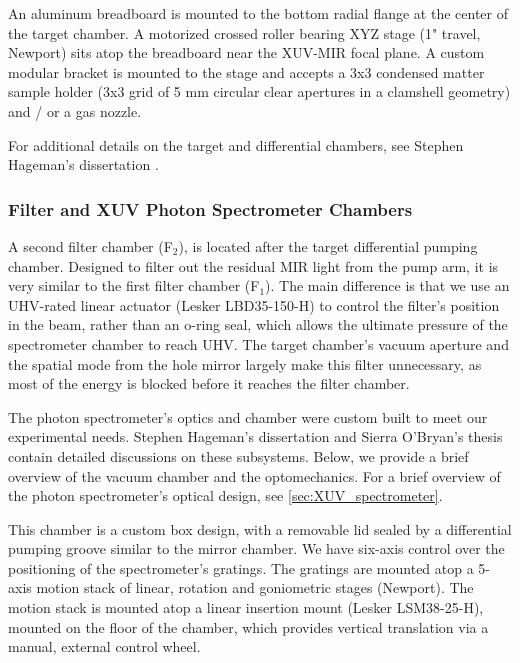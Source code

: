 An aluminum breadboard is mounted to the bottom radial flange at the center of the target chamber. A motorized crossed roller bearing XYZ stage (1" travel, Newport) sits atop the breadboard near the XUV-MIR focal plane. A custom modular bracket is mounted to the stage and accepts a 3x3 condensed matter sample holder (3x3 grid of 5 mm circular clear apertures in a clamshell geometry) and / or a gas nozzle.

For additional details on the target and differential chambers, see Stephen Hageman's dissertation \cite{hagemanComplexAttosecondTransient2020}.

\subsubsection{ Filter and XUV Photon Spectrometer Chambers}

A second filter chamber (F$_2$), is located after the target differential pumping chamber. Designed to filter out the residual MIR light from the pump arm, it is very similar to the first filter chamber (F$_1$). The main difference is that we use an UHV-rated linear actuator (Lesker LBD35-150-H) to control the filter's position in the beam, rather than an o-ring seal, which allows the ultimate pressure of the spectrometer chamber to reach UHV. The target chamber's vacuum aperture and the spatial mode from the hole mirror largely make this filter unnecessary, as most of the energy is blocked before it reaches the filter chamber.

The photon spectrometer's optics and chamber were custom built to meet our experimental needs. Stephen Hageman's dissertation \cite{hagemanComplexAttosecondTransient2020} and Sierra O'Bryan's thesis \cite{obryanHighResolutionXUV2015} contain detailed discussions on these subsystems. Below, we provide a brief overview of the vacuum chamber and the optomechanics. For a brief overview of the photon spectrometer's optical design, see \cref{sec:XUV_spectrometer}.

This chamber is a custom box design, with a removable lid sealed by a differential pumping groove similar to the mirror chamber. We have six-axis control over the positioning of the spectrometer's gratings. The gratings are mounted atop a 5-axis motion stack of linear, rotation and goniometric stages (Newport). The motion stack is mounted atop a linear insertion mount (Lesker LSM38-25-H), mounted on the floor of the chamber, which provides vertical translation via a manual, external control wheel.

